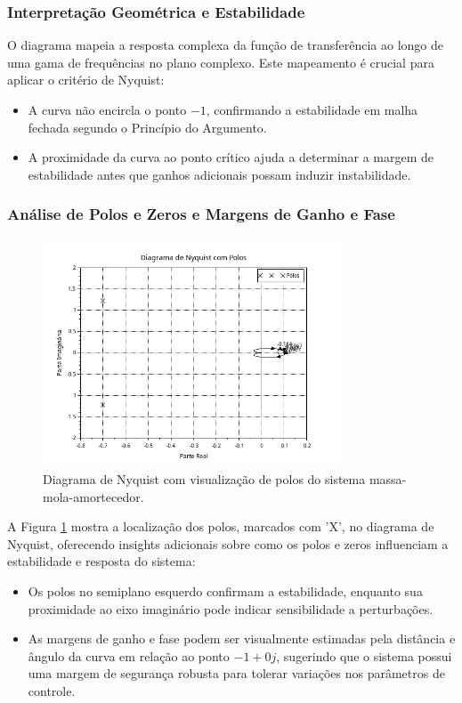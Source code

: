 \subsubsection{Interpretação Geométrica e Estabilidade}

O diagrama mapeia a resposta complexa da função de transferência ao longo de uma gama de frequências no plano complexo. Este mapeamento é crucial para aplicar o critério de Nyquist:
\begin{itemize}
    \item A curva não encircla o ponto \(-1\), confirmando a estabilidade em malha fechada segundo o Princípio do Argumento.
    \item A proximidade da curva ao ponto crítico ajuda a determinar a margem de estabilidade antes que ganhos adicionais possam induzir instabilidade.
\end{itemize}

\subsubsection{Análise de Polos e Zeros e Margens de Ganho e Fase}

\begin{figure}[H]
    \centering
    \includegraphics[width=0.8\textwidth]{atividades/9-atividade/assets/nyquist-com-polos.png}
    \caption{Diagrama de Nyquist com visualização de polos do sistema massa-mola-amortecedor.}
    \label{fig:NyquistPolos}
\end{figure}

A Figura \ref{fig:NyquistPolos} mostra a localização dos polos, marcados com 'X', no diagrama de Nyquist, oferecendo insights adicionais sobre como os polos e zeros influenciam a estabilidade e resposta do sistema:
\begin{itemize}
    \item Os polos no semiplano esquerdo confirmam a estabilidade, enquanto sua proximidade ao eixo imaginário pode indicar sensibilidade a perturbações.
    \item As margens de ganho e fase podem ser visualmente estimadas pela distância e ângulo da curva em relação ao ponto \(-1 + 0j\), sugerindo que o sistema possui uma margem de segurança robusta para tolerar variações nos parâmetros de controle.
\end{itemize}

